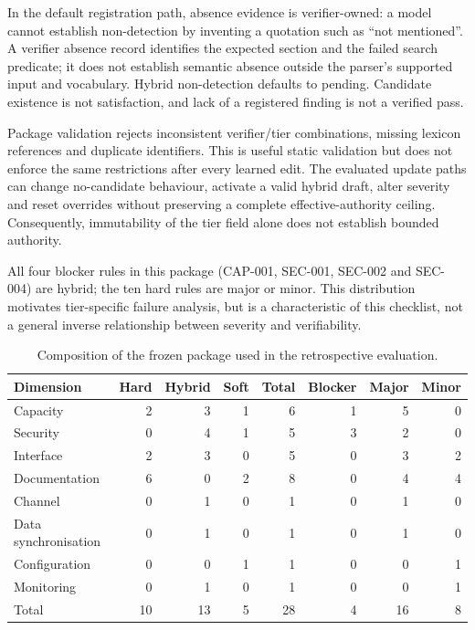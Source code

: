 \documentclass[computers,article,submit,moreauthors]{Definitions/mdpi}
\begin{document}
In the default registration path, absence evidence is verifier-owned: a model cannot establish non-detection by inventing a quotation such as ``not mentioned''. A verifier absence record identifies the expected section and the failed search predicate; it does not establish semantic absence outside the parser's supported input and vocabulary. Hybrid non-detection defaults to pending. Candidate existence is not satisfaction, and lack of a registered finding is not a verified pass.

Package validation rejects inconsistent verifier/tier combinations, missing lexicon references and duplicate identifiers. This is useful static validation but does not enforce the same restrictions after every learned edit. The evaluated update paths can change no-candidate behaviour, activate a valid hybrid draft, alter severity and reset overrides without preserving a complete effective-authority ceiling. Consequently, immutability of the tier field alone does not establish bounded authority.

All four blocker rules in this package (CAP-001, SEC-001, SEC-002 and SEC-004) are hybrid; the ten hard rules are major or minor. This distribution motivates tier-specific failure analysis, but is a characteristic of this checklist, not a general inverse relationship between severity and verifiability.

\begin{table}[!ht]
\caption{Composition of the frozen package used in the retrospective evaluation.}
\label{tab:composition}
\centering\footnotesize
\begin{tabular}{@{}lrrr rrrr@{}}
\toprule
Dimension & Hard & Hybrid & Soft & Total & Blocker & Major & Minor \\
\midrule
Capacity & 2 & 3 & 1 & 6 & 1 & 5 & 0 \\
Security & 0 & 4 & 1 & 5 & 3 & 2 & 0 \\
Interface & 2 & 3 & 0 & 5 & 0 & 3 & 2 \\
Documentation & 6 & 0 & 2 & 8 & 0 & 4 & 4 \\
Channel & 0 & 1 & 0 & 1 & 0 & 1 & 0 \\
Data synchronisation & 0 & 1 & 0 & 1 & 0 & 1 & 0 \\
Configuration & 0 & 0 & 1 & 1 & 0 & 0 & 1 \\
Monitoring & 0 & 1 & 0 & 1 & 0 & 0 & 1 \\
\midrule
Total & 10 & 13 & 5 & 28 & 4 & 16 & 8 \\
\bottomrule
\end{tabular}
\end{table}
\end{document}
